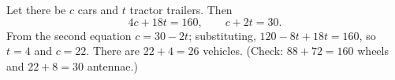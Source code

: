Let there be $c$ cars and $t$ tractor trailers. Then
\[4c+18t=160,\qquad c+2t=30.\]
From the second equation $c=30-2t$; substituting, $120-8t+18t=160$, so $t=4$ and $c=22$. There are $22+4=\boxed{26}$ vehicles. (Check: $88+72=160$ wheels and $22+8=30$ antennae.)
